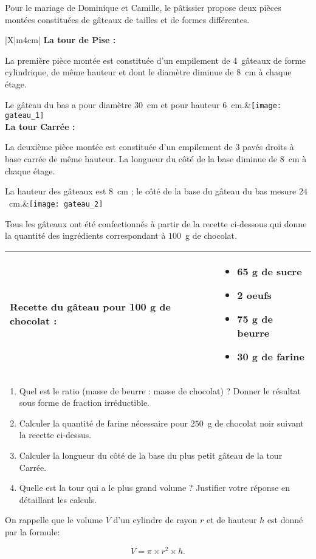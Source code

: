 
\medskip

Pour le mariage de Dominique et Camille, le pâtissier propose deux pièces montées constituées de
gâteaux de tailles et de formes différentes.
\begin{center}
\begin{tabularx}{\linewidth}{|X|m{4cm}|}\hline
\textbf{La tour de Pise :}

La première pièce montée est constituée d'un empilement de
4~gâteaux de forme cylindrique, de même hauteur et dont le
diamètre diminue de $8$~cm à chaque étage.

Le gâteau du bas a pour diamètre $30$~cm et pour hauteur $6$~cm.&\texttt{[image: gateau\_1]}\\ \hline
\textbf{La tour Carrée :}

La deuxième pièce montée est constituée d'un empilement de
$3$ pavés droits à base carrée de même hauteur. La longueur du
côté de la base diminue de $8$~cm à chaque étage.

La hauteur des gâteaux est $8$~cm ; le côté de la base du gâteau
du bas mesure $24$~cm.&\texttt{[image: gateau\_2]}\\ \hline
\end{tabularx}
\end{center}
\medskip

Tous les gâteaux ont été confectionnés à partir de la recette ci-dessous qui donne la quantité des
ingrédients correspondant à $100$~g de chocolat.

\begin{center}
\begin{tabularx}{\linewidth}{|X|X|}\hline
\textbf{Recette du gâteau pour 100 g de chocolat :}& \begin{itemize}
\item 65 g de sucre
\item 2 oeufs
\item 75 g de beurre
\item 30 g de farine
\end{itemize}\\ \hline
\end{tabularx}
\end{center}

\begin{enumerate}
\item Quel est le ratio (masse de beurre : masse de chocolat) ? Donner le résultat sous forme de fraction irréductible.

\item  Calculer la quantité de farine nécessaire pour $250$~g de chocolat noir suivant la recette ci-dessus.

\item Calculer la longueur du côté de la base du plus petit gâteau de la tour Carrée.

\item  Quelle est la tour qui a le plus grand volume ? Justifier votre réponse en détaillant les calculs.

\end{enumerate}

On rappelle que le volume $V$ d'un cylindre de rayon $r$ et de hauteur $h$ est donné par la formule:

\[V = \pi \times  r^2 \times h.\]

\bigskip

